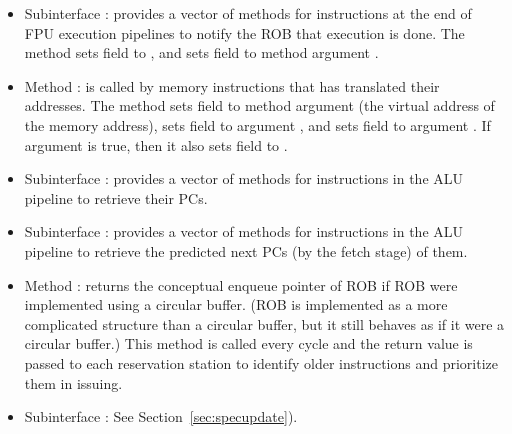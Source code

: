 \begin{itemize}
    \item Subinterface : provides a vector of methods for instructions at the end of FPU execution pipelines to notify the ROB that execution is done.
    The method sets field  to , and sets field  to method argument .
    
    \item Method : is called by memory instructions that has translated their addresses.
    The method sets field  to method argument  (the virtual address of the memory address), sets field  to argument , and sets field  to argument .
    If argument  is true, then it also sets field  to .
    
    \item Subinterface : provides a vector of methods for instructions in the ALU pipeline to retrieve their PCs.
    
    \item Subinterface : provides a vector of methods for instructions in the ALU pipeline to retrieve the predicted next PCs (by the fetch stage) of them.
    
    \item Method : returns the conceptual enqueue pointer of ROB if ROB were implemented using a circular buffer.
    (ROB is implemented as a more complicated structure than a circular buffer, but it still behaves as if it were a circular buffer.)
    This method is called every cycle and the return value is passed to each reservation station to identify older instructions and prioritize them in issuing.
    
    \item Subinterface : See Section~\ref{sec:specupdate}).
\end{itemize}

